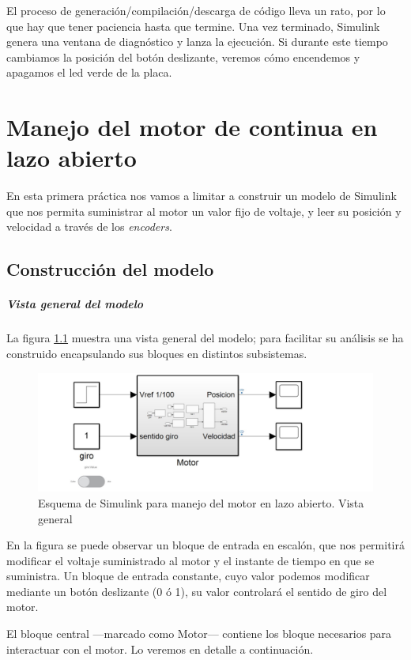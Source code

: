 \documentclass[10pt,a4paper]{report}
\begin{document}
El proceso de generación/compilación/descarga de código lleva un rato, por lo que hay que tener paciencia hasta que termine. Una vez terminado, Simulink genera una ventana de diagnóstico y lanza la ejecución. Si durante este tiempo cambiamos la posición del botón deslizante, veremos cómo encendemos y apagamos el led verde de la placa.

\chapter{Manejo del motor de continua en lazo abierto}
En esta primera práctica nos vamos a limitar a construir un modelo de Simulink que nos permita suministrar al motor un valor fijo de voltaje, y leer su posición y velocidad a través de los \emph{encoders}.
\section{Construcción del modelo}
\paragraph{Vista general del modelo} La figura \ref{f18} muestra una vista general del modelo; para facilitar su análisis se ha construido encapsulando sus bloques en distintos subsistemas.
\begin{figure}
\includegraphics[width=\textwidth]{la1.jpg}
\caption{Esquema de Simulink para manejo del motor en lazo abierto. Vista general} \label{f18}
\end{figure}

En la figura se puede observar un bloque de entrada en escalón, que nos permitirá modificar el voltaje suministrado al motor y el instante de tiempo en que se suministra. Un bloque de entrada constante, cuyo valor podemos modificar mediante un botón deslizante (0 ó 1), su valor controlará el sentido de giro del motor.

El bloque central ---marcado como Motor--- contiene los bloque necesarios para interactuar con el motor. Lo veremos en detalle a continuación.
\end{document}
